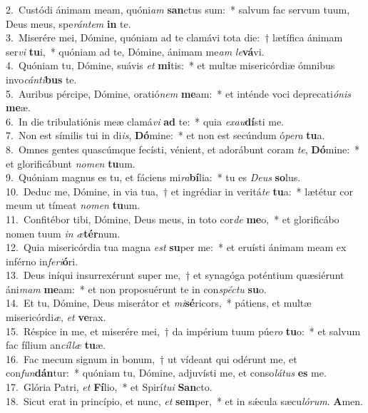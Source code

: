 {2.~}Custódi ánimam meam, quóni\textit{am} \textbf{san}ctus sum:~* salvum fac servum tuum, Deus meus, spe\textit{rán}\textit{tem} \textbf{in} te.\\
{3.~}Miserére mei, Dómine, quóniam ad te clamávi tota die:~† lætífica ánimam ser\textit{vi} \textbf{tu}i,~* quóniam ad te, Dómine, ánimam me\textit{am} \textit{le}\textbf{vá}vi.\\
{4.~}Quóniam tu, Dómine, suávis \textit{et} \textbf{mi}tis:~* et multæ misericórdiæ ómnibus invo\textit{cán}\textit{ti}\textbf{bus} te.\\
{5.~}Auribus pércipe, Dómine, oratió\textit{nem} \textbf{me}am:~* et inténde voci deprecati\textit{ó}\textit{nis} \textbf{me}æ.\\
{6.~}In die tribulatiónis meæ clamá\textit{vi} \textbf{ad} te:~* quia \textit{e}\textit{xau}\textbf{dí}sti me.\\
{7.~}Non est símilis tui in di\textit{is}, \textbf{Dó}mine:~* et non est secúndum ó\textit{pe}\textit{ra} \textbf{tu}a.\\
{8.~}Omnes gentes quascúmque fecísti, vénient, et adorábunt coram \textit{te}, \textbf{Dó}mine:~* et glorificábunt \textit{no}\textit{men} \textbf{tu}um.\\
{9.~}Quóniam magnus es tu, et fáciens mi\textit{ra}\textbf{bí}lia:~* tu es \textit{De}\textit{us} \textbf{so}lus.\\
{10.~}Deduc me, Dómine, in via tua,~† et ingrédiar in veritá\textit{te} \textbf{tu}a:~* lætétur cor meum ut tímeat \textit{no}\textit{men} \textbf{tu}um.\\
{11.~}Confitébor tibi, Dómine, Deus meus, in toto cor\textit{de} \textbf{me}o,~* et glorificábo nomen tuum \textit{in} \textit{æ}\textbf{tér}num.\\
{12.~}Quia misericórdia tua magna \textit{est} \textbf{su}per me:~* et eruísti ánimam meam ex inférno in\textit{fe}\textit{ri}\textbf{ó}ri.\\
{13.~}Deus iníqui insurrexérunt super me,~† et synagóga poténtium quæsiérunt áni\textit{mam} \textbf{me}am:~* et non proposuérunt te in con\textit{spé}\textit{ctu} \textbf{su}o.\\
{14.~}Et tu, Dómine, Deus miserátor et \textit{mi}\textbf{sé}ricors,~* pátiens, et multæ misericórdi\textit{æ}, \textit{et} \textbf{ve}rax.\\
{15.~}Réspice in me, et miserére mei,~† da impérium tuum púe\textit{ro} \textbf{tu}o:~* et salvum fac fílium an\textit{cíl}\textit{læ} \textbf{tu}æ.\\
{16.~}Fac mecum signum in bonum,~† ut vídeant qui odérunt me, et con\textit{fun}\textbf{dán}tur:~* quóniam tu, Dómine, adjuvísti me, et conso\textit{lá}\textit{tus} \textbf{es} me.\\
{17.~}Glória Patri, \textit{et} \textbf{Fí}lio,~* et Spirí\textit{tu}\textit{i} \textbf{San}cto.\\
{18.~}Sicut erat in princípio, et nunc, \textit{et} \textbf{sem}per,~* et in sǽcula sæcu\textit{ló}\textit{rum}. \textbf{A}men.\\
